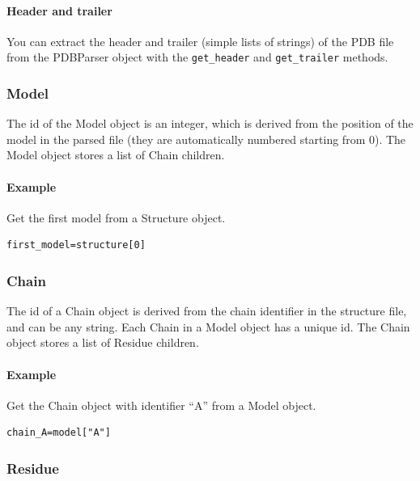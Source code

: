 \documentclass{report}
\begin{document}
\paragraph{Header and trailer}

You can extract the header and trailer (simple lists of strings) of the PDB
file from the PDBParser object with the {\tt get\_header} and {\tt get\_trailer}
methods.


\subsubsection{Model}

The id of the Model object is an integer, which is derived from the position
of the model in the parsed file (they are automatically numbered starting from
0). The Model object stores a list of Chain children. 


\paragraph{Example}

Get the first model from a Structure object.

\begin{verbatim}
first_model=structure[0]
\end{verbatim}

\subsubsection{Chain}

The id of a Chain object is derived from the chain identifier in the structure
file, and can be any string. Each Chain in a Model object has a unique id. The
Chain object stores a list of Residue children. 


\paragraph{Example}

Get the Chain object with identifier {}``A{}'' from a Model object.

\begin{verbatim}
chain_A=model["A"]
\end{verbatim}

\subsubsection{Residue}
\end{document}
